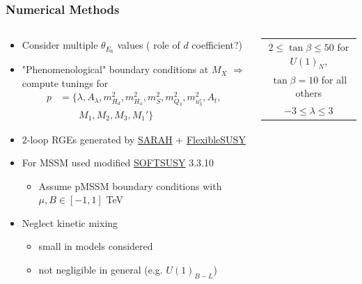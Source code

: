 \documentclass[10pt,aspectratio=169]{beamer}
\begin{document}
\begin{frame}
  \frametitle{Numerical Methods}
  \begin{columns}
    \begin{column}{0.6\textwidth}
      \begin{itemize} \itemsep1em
        \item Consider multiple $\theta_{E_6}$ values ({\color{blue}
          role of $d$ coefficient?})
        \item "Phenomenological" boundary conditions at $M_X$ $\Rightarrow$
          compute tunings for
          \begin{align*}
            p &= \{ \lambda, A_\lambda, m_{H_d}^2, m_{H_u}^2, m_S^2,
              m_{Q_3}^2, m_{u_3^c}^2, A_t,\\
            & \quad \quad {} M_1, M_2, M_3, M_1' \}
          \end{align*}
        \item 2-loop RGEs generated by
          \href{https://sarah.hepforge.org/}{SARAH} $+$
          \href{https://flexiblesusy.hepforge.org/}{FlexibleSUSY}
        \item For MSSM used modified
          \href{http://softsusy.hepforge.org/}{SOFTSUSY} 3.3.10
          \begin{itemize}
            \item Assume pMSSM boundary conditions with $\mu, B \in [-1,1]$
              TeV
          \end{itemize}
        \item Neglect kinetic mixing
          \begin{itemize}
            \item small in models considered
            \item \alert{not negligible in general (e.g. $U(1)_{B-L}$)}
          \end{itemize}
      \end{itemize}
    \end{column}
    \begin{column}{0.4\textwidth}
      \vspace*{-20pt}
      \begin{table}[h]
        \centering
        \begin{tabulary}{\textwidth}{C}
          \toprule
          $2 \leq \tan\beta \leq 50$ for $U(1)_N$, \\
          $\tan\beta = 10$ for all others \\
          \midrule
          $-3 \leq \lambda \leq 3$\\

\end{tabulary}
\end{table}
\end{column}
\end{columns}
\end{frame}
\end{document}
